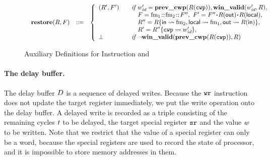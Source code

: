 \begin{figure}[!t]
\[\begin{array}{l}
\begin{array}{lcl}
            \incwin(\RFile, \Wstack) & \define &
            \left\{
            \begin{array}{ll}
                (\RFile', \Wstack')
                & \quad \textit{if }
                             \cwp' = \postcwp(\RFile(\regcwp)),
                             \winvalid(\cwp', \RFile), \\
                & \quad \ \ \
                             \Wstack = \fm_1 \stCons \fm_2 \stCons \Wstack''  , \
                              \Wstack' = \Wstack''\lstApp \RFile(\outRN)
                                                  \lstApp \RFile(\localRN), \\
                & \quad \ \ \ \RFile'' =
                \RFile\{\inRN\rightsquigarrow \fm_2,
                        \localRN\rightsquigarrow \fm_1,
                        \outRN \rightsquigarrow \RFile(\inRN)\},
                \\
                 & \quad \ \ \
                            \RFile' = \fsubst{\RFile''}\regcwp{\cwp'},
                 \\
                \perp &\quad \textit{if }
                                  \lnot\winvalid(\postcwp(R(\regcwp)), \RFile)
            \end{array}
            \right.
        \end{array}
    \end{array}
    \]
    \caption{Auxiliary Definitions for Instruction \csave{} and \crestore}
    \label{fig:save and restore}
\end{figure}

\paragraph{\textbf{The delay buffer.}}
The delay buffer $D$ is a sequence of delayed writes.
Because the  $\texttt{wr}$ instruction
does not update the target register immediately,
we put the write operation onto the delay buffer.
A delayed write is recorded as a triple consisting of
the remaining cycles $t$ to be delayed,
the target special register $\texttt{sr}$ and the value
$w$ to be written. Note that we restrict that
the value of a special register can only be a word,
because the special registers are used to record the
state of processor, and it is impossible to
store memory addresses in them.

